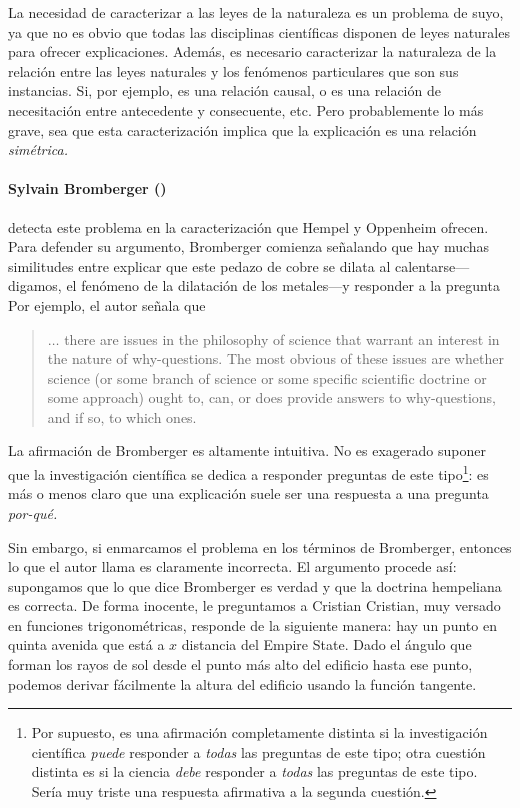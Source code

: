La necesidad de caracterizar a las leyes de la naturaleza es
un problema de suyo, ya que no es obvio que todas las
disciplinas científicas  disponen de leyes naturales para
ofrecer explicaciones. Además, es necesario caracterizar la
naturaleza de la relación entre las leyes naturales y los
fenómenos particulares que son sus instancias. Si, por
ejemplo, es una relación causal, o es una relación de
necesitación entre antecedente y consecuente, etc. Pero
probablemente lo más grave, sea que esta
caracterización implica que la explicación es una relación
\emph{simétrica.}


\paragraph{Sylvain Bromberger (\citeyear{Bromberger1966})}
detecta este problema en la caracterización que Hempel y
Oppenheim ofrecen. Para defender su argumento, Bromberger
comienza señalando que hay muchas similitudes entre explicar
que este pedazo de cobre se dilata al calentarse---digamos, 
el fenómeno de la dilatación de los metales---y responder a
la pregunta  Por ejemplo, el autor señala que

	\begin{quote}
    $ \ldots $ there are issues in the philosophy of science
    that warrant an interest in the nature of why-questions.
    The most obvious of these issues are whether science (or
    some branch of science or some specific scientific
    doctrine or some approach) ought to, can, or does
    provide answers to why-questions, and if so, to which
    ones.
	\end{quote}

La afirmación de Bromberger es altamente intuitiva. No
es exagerado suponer que la investigación científica
se dedica a responder preguntas de este tipo\footnote{
  Por supuesto, es una afirmación	completamente distinta si
  la	investigación científica \emph{puede} responder a
  \emph{todas} las preguntas de este tipo; otra cuestión
  distinta es si la	ciencia \emph{debe} responder a
  \emph{todas} las preguntas de este tipo. Sería muy triste
  una respuesta afirmativa a la segunda cuestión.
}:
es más o menos claro que una explicación suele ser una
respuesta a una pregunta \emph{por-qué.}

Sin embargo, si  enmarcamos el problema en los términos de
Bromberger, entonces lo que el autor llama  es claramente incorrecta. El argumento procede
así: supongamos que lo que dice Bromberger es verdad y que
la doctrina hempeliana es correcta. De forma inocente, le
preguntamos a Cristian  Cristian, muy versado en
funciones trigonométricas, responde de la siguiente manera:
hay un punto en quinta  avenida que está a $ x $ distancia
del Empire State. Dado el ángulo que forman los rayos de sol
desde el punto más alto del edificio hasta ese punto,
podemos derivar fácilmente la altura del edificio usando la
función tangente.

